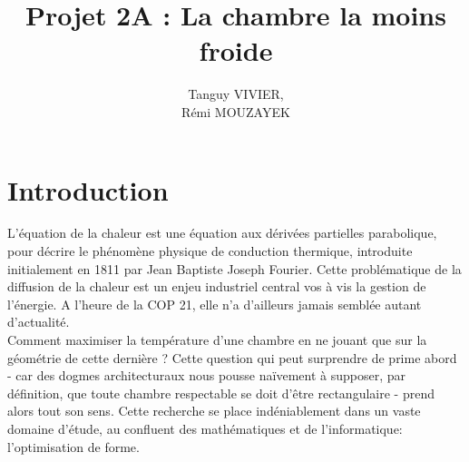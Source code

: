 \documentclass[a4paper,reqno]{article}
\begin{document}
\title{Projet 2A : La chambre la moins froide}
\author{Tanguy VIVIER, \\
Rémi MOUZAYEK}
\maketitle
\newpage

\setlength{\parindent}{1cm}
\part*{Introduction}
L'équation de la chaleur est une équation aux dérivées partielles 
parabolique, pour décrire le phénomène physique de conduction thermique, introduite initialement en 1811 par Jean Baptiste Joseph Fourier. Cette problématique de la diffusion de la chaleur est un enjeu industriel central vos à vis la gestion de l'énergie. A l'heure de la COP 21, elle n'a d'ailleurs jamais semblée autant d'actualité. \\
Comment maximiser la température d'une chambre en ne jouant que sur la géométrie de cette dernière ? Cette question qui peut surprendre de prime abord - car des dogmes architecturaux nous pousse naïvement à supposer, par définition, que toute chambre respectable se doit d'être rectangulaire - prend alors tout son sens.
Cette recherche se place indéniablement dans un vaste domaine d'étude, au confluent des mathématiques et de l'informatique: l'optimisation de forme. \\


\end{document}

